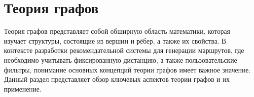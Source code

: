 \section{Теория графов}
Теория графов представляет собой обширную область математики, которая изучает структуры, состоящие из вершин и рёбер, а также их свойства. В контексте разработки рекомендательной системы для генерации маршрутов, где необходимо учитывать фиксированную дистанцию, а также пользовательские фильтры, понимание основных концепций теории графов имеет важное значение. Данный раздел представляет обзор ключевых аспектов теории графов и их применение.

